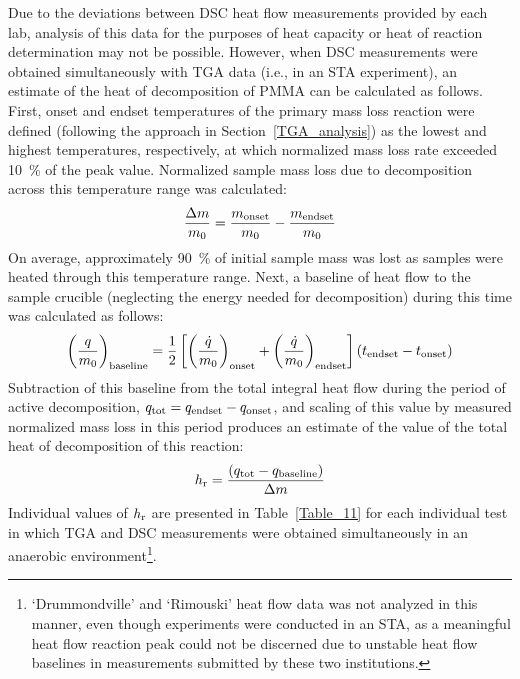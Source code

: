 \documentclass{book}
\begin{document}
Due to the deviations between DSC heat flow measurements provided by each lab, analysis of this data for the purposes of heat capacity or heat of reaction determination may not be possible. However, when DSC measurements were obtained simultaneously with TGA data (i.e., in an STA experiment), an estimate of the heat of decomposition of PMMA can be calculated as follows. First, onset and endset temperatures of the primary mass loss reaction were defined (following the approach in Section~\ref{TGA_analysis}) as the lowest and highest temperatures, respectively, at which normalized mass loss rate exceeded 10~\% of the peak value. Normalized sample mass loss due to decomposition across this temperature range was calculated:
\begin{equation}
\frac{\Delta m}{m_0}=\frac{m_{\rm onset}}{m_0}-\frac{m_{\rm endset}}{m_0}
\end{equation}
On average, approximately 90~\% of initial sample mass was lost as samples were heated through this temperature range. Next, a baseline of heat flow to the sample crucible (neglecting the energy needed for decomposition) during this time was calculated as follows:
\begin{equation}
   \left( \frac{q}{m_0} \right)_{\rm baseline} = \frac{1}{2} \left[ \left( \frac{\dot{q}}{m_0} \right)_{\rm onset} + \left( \frac{\dot{q}}{m_0} \right)_{\rm endset} \right] \left(t_{\rm endset}-t_{\rm onset} \right)
\end{equation}
Subtraction of this baseline from the total integral heat flow during the period of active decomposition, $q_{\rm tot}=q_{\rm endset}-q_{\rm onset}$, and scaling of this value by measured normalized mass loss in this period produces an estimate of the value of the total heat of decomposition of this reaction:
\begin{equation}
h_{\rm r} = \frac{\left(q_{\rm tot}-q_{\rm baseline}\right)}{\Delta m}
\end{equation}
Individual values of $h_{\rm r}$ are presented in Table~\ref{Table_11} for each individual test in which TGA and DSC measurements were obtained simultaneously in an anaerobic environment\footnote{‘Drummondville’ and ‘Rimouski’ heat flow data was not analyzed in this manner, even though experiments were conducted in an STA, as a meaningful heat flow reaction peak could not be discerned due to unstable heat flow baselines in measurements submitted by these two institutions.}.
\end{document}
